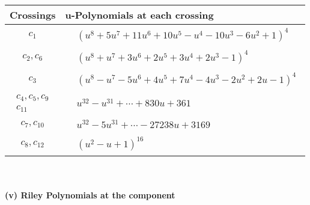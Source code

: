 \documentclass[1p]{elsarticle_modified}
\theoremstyle{definition}
\begin{document}
\begin{tabular}{m{50pt}|m{274pt}}
Crossings & \hspace{64pt}u-Polynomials at each crossing \\
\hline $$\begin{aligned}c_{1}\end{aligned}$$&$\begin{aligned}
&(u^8+5 u^7+11 u^6+10 u^5- u^4-10 u^3-6 u^2+1)^4
\end{aligned}$\\
\hline $$\begin{aligned}c_{2},c_{6}\end{aligned}$$&$\begin{aligned}
&(u^8+u^7+3 u^6+2 u^5+3 u^4+2 u^3-1)^4
\end{aligned}$\\
\hline $$\begin{aligned}c_{3}\end{aligned}$$&$\begin{aligned}
&(u^8- u^7-5 u^6+4 u^5+7 u^4-4 u^3-2 u^2+2 u-1)^4
\end{aligned}$\\
\hline $$\begin{aligned}c_{4},c_{5},c_{9}\\c_{11}\end{aligned}$$&$\begin{aligned}
&u^{32}- u^{31}+\cdots+830 u+361
\end{aligned}$\\
\hline $$\begin{aligned}c_{7},c_{10}\end{aligned}$$&$\begin{aligned}
&u^{32}-5 u^{31}+\cdots-27238 u+3169
\end{aligned}$\\
\hline $$\begin{aligned}c_{8},c_{12}\end{aligned}$$&$\begin{aligned}
&(u^2- u+1)^{16}
\end{aligned}$\\
\hline
\end{tabular}\\~\\
\newpage\renewcommand{\arraystretch}{1}
\flushleft \textbf{(v) Riley Polynomials at the component}\newline \\
\end{document}
